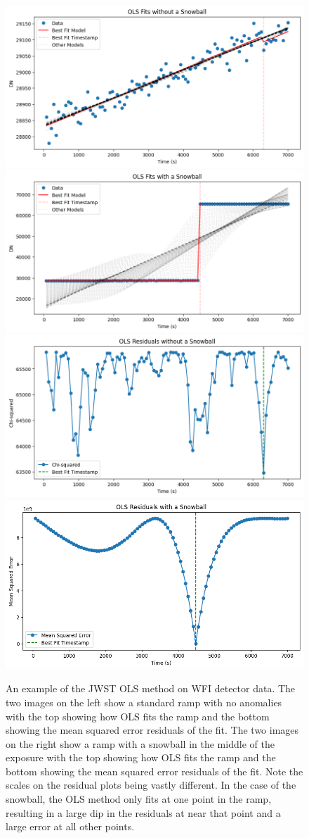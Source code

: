 \begin{figure}
    \centering
    \includegraphics[width=.49\linewidth]{figs/rst/ols_good.png}
    \includegraphics[width=.49\linewidth]{figs/rst/ols_bad.png}
    \includegraphics[width=.49\linewidth]{figs/rst/ols_good_res.png}
    \includegraphics[width=.49\linewidth]{figs/rst/ols_bad_res.png}
    \caption[Example of the JWST OLS Method on WFI Detector Data]{
        An example of the JWST OLS method on WFI detector data.
        The two images on the left show a standard ramp with no anomalies with the top showing how OLS fits the ramp and the bottom showing the mean squared error residuals of the fit.
        The two images on the right show a ramp with a snowball in the middle of the exposure with the top showing how OLS fits the ramp and the bottom showing the mean squared error residuals of the fit.
        Note the scales on the residual plots being vastly different.
        In the case of the snowball, the OLS method only fits at one point in the ramp, resulting in a large dip in the residuals at near that point and a large error at all other points.
    }
    \label{rst/fig:jwst_ols}
\end{figure}

